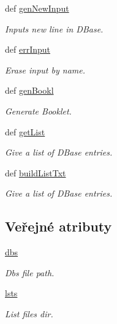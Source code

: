\begin{DoxyCompactItemize}
def \hyperlink{classDBHand_1_1DBHand_a102843d4ad41bcf04b55044e20cc7db2}{gen\-New\-Input}
\begin{DoxyCompactList}\small\item\em Inputs new line in D\-Base. \end{DoxyCompactList}\item 
def \hyperlink{classDBHand_1_1DBHand_ab7fabebb9aeaf8bcb236a64d5bd9d344}{err\-Input}
\begin{DoxyCompactList}\small\item\em Erase input by name. \end{DoxyCompactList}\item 
def \hyperlink{classDBHand_1_1DBHand_aa038194a09dd084c5c872238d9a03ff5}{gen\-Bookl}
\begin{DoxyCompactList}\small\item\em Generate Booklet. \end{DoxyCompactList}\item 
def \hyperlink{classDBHand_1_1DBHand_a0840cbf8e159fcbb1c3162e7ea4b2537}{get\-List}
\begin{DoxyCompactList}\small\item\em Give a list of D\-Base entries. \end{DoxyCompactList}\item 
def \hyperlink{classDBHand_1_1DBHand_a399c895359ec5a0bf451e47c4a4274b1}{build\-List\-Txt}
\begin{DoxyCompactList}\small\item\em Give a list of D\-Base entries. \end{DoxyCompactList}\end{DoxyCompactItemize}
\subsection*{Veřejné atributy}
\begin{DoxyCompactItemize}
\item 
\hypertarget{classDBHand_1_1DBHand_a9a2cff8d8862395801ab604f1570f971}{\hyperlink{classDBHand_1_1DBHand_a9a2cff8d8862395801ab604f1570f971}{dbs}}\label{classDBHand_1_1DBHand_a9a2cff8d8862395801ab604f1570f971}

\begin{DoxyCompactList}\small\item\em Dbs file path. \end{DoxyCompactList}\item 
\hypertarget{classDBHand_1_1DBHand_a43d2f414ba37b36069bf6020098911b1}{\hyperlink{classDBHand_1_1DBHand_a43d2f414ba37b36069bf6020098911b1}{lsts}}\label{classDBHand_1_1DBHand_a43d2f414ba37b36069bf6020098911b1}

\begin{DoxyCompactList}\small\item\em List files dir. \end{DoxyCompactList}\end{DoxyCompactItemize}


